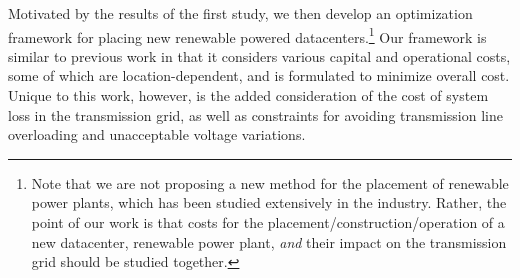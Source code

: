 

Motivated by the results of the first study, we then develop an optimization framework for placing new renewable powered datacenters.\footnote{Note that we are not proposing a new method for the placement of renewable power plants, which has been studied extensively in the industry.  Rather, the point of our work is that costs for the placement/construction/operation of a new datacenter, renewable power plant, {\em and} their impact on the transmission grid should be studied together.}  Our framework is similar to previous work in that it considers various capital and operational costs, some of which are location-dependent, and is formulated to minimize overall cost.  Unique to this work, however, is the added consideration of the cost of system loss in the transmission grid, as well as constraints for avoiding transmission line overloading and unacceptable voltage variations.

